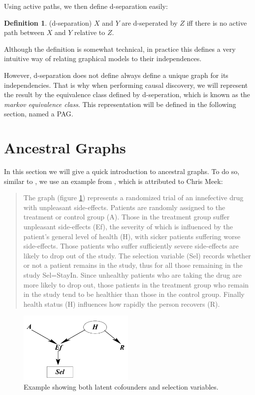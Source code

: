 \documentclass[11pt,a4paper]{report}
\theoremstyle{definition}
\newtheorem{defn}{Definition}[section]
\begin{document}
Using active paths, we then define d-separation easily:

\begin{defn}(d-separation)
  $X$ and $Y$ are d-seperated by $Z$ iff there is no active path between
  $X$ and $Y$ relative to $Z$.
\end{defn}

Although the definition is somewhat technical, in practice this defines a
very intuitive way of relating graphical models to their independences.

However, d-separation does not define always define a unique graph for its
independencies.  That is why
when performing causal discovery, we will represent the result by the
equivalence class defined by d-seperation, which is known as the
\emph{markov equivalence class}. This representation will be defined in
the following section, named a PAG.

\section{Ancestral Graphs}
In this section we will give a quick introduction to ancestral graphs.  To
do so, similar to \cite{zhangCompletenessOrientationRules2008}, we use an
example from \cite{richardsonChainGraphsSymmetric1998}, which is
attributed to Chris Meek:

\begin{quote}
  The graph (figure \ref{fig:example}) represents a randomized trial of an
  innefective drug with unpleasant side-effects. Patients are randomly
  assigned to the treatment or control group (A). Those in the treatment
  group suffer unpleasant side-effects (Ef), the severity of which is
  influenced by the patient's general level of health (H), with sicker
  patients suffering worse side-effects. Those patients who suffer
  sufficiently severe side-effects are likely to drop out of the study.
  The selection variable (Sel) records whether or not a patient remains in
  the study, thus for all those remaining in the study Sel=StayIn. Since
  unhealthy patients who are taking the drug are more likely to drop out,
  those patients in the treatment group who remain in the study tend to be
  healthier than those in the control group. Finally health status (H)
  influences how rapidly the person recovers (R).
\end{quote}

\begin{figure}
  \centering
  \includegraphics[width=0.5\textwidth]{imgs/example1.png}
  \caption{Example showing both latent cofounders and selection variables.}
  \label{fig:example}
\end{figure}
\end{document}
